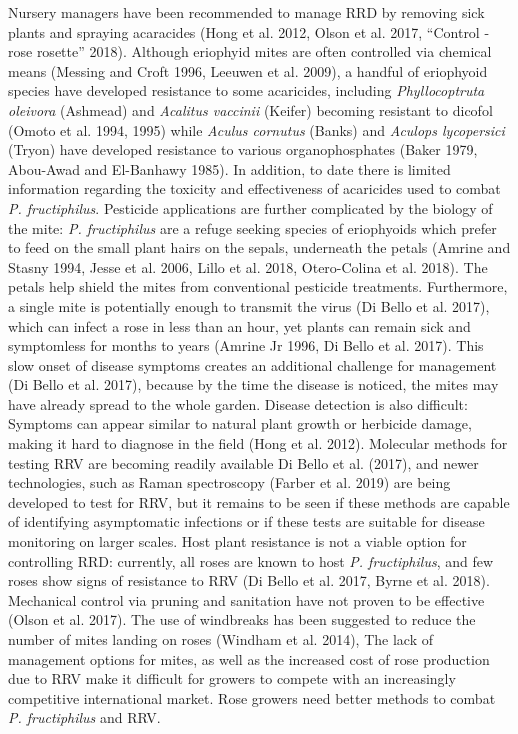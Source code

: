 \documentclass[12pt,final,CPage]{ufthesis}
\begin{document}
{  Nursery managers have been recommended to manage RRD by removing sick plants and spraying acaracides (Hong et al. 2012, Olson et al. 2017, {``Control - rose rosette''} 2018). Although eriophyid mites are often controlled via chemical means (Messing and Croft 1996, Leeuwen et al. 2009), a handful of eriophyoid species have developed resistance to some acaricides, including \emph{Phyllocoptruta oleivora} (Ashmead) and \emph{Acalitus vaccinii} (Keifer) becoming resistant to dicofol (Omoto et al. 1994, 1995) while \emph{Aculus cornutus} (Banks) and \emph{Aculops lycopersici} (Tryon) have developed resistance to various organophosphates (Baker 1979, Abou-Awad and El-Banhawy 1985). In addition, to date there is limited information regarding the toxicity and effectiveness of acaricides used to combat \emph{P. fructiphilus}. Pesticide applications are further complicated by the biology of the mite: \emph{P. fructiphilus} are a refuge seeking species of eriophyoids which prefer to feed on the small plant hairs on the sepals, underneath the petals (Amrine and Stasny 1994, Jesse et al. 2006, Lillo et al. 2018, Otero-Colina et al. 2018). The petals help shield the mites from conventional pesticide treatments. Furthermore, a single mite is potentially enough to transmit the virus (Di Bello et al. 2017), which can infect a rose in less than an hour, yet plants can remain sick and symptomless for months to years (Amrine Jr 1996, Di Bello et al. 2017). This slow onset of disease symptoms creates an additional challenge for management (Di Bello et al. 2017), because by the time the disease is noticed, the mites may have already spread to the whole garden. Disease detection is also difficult: Symptoms can appear similar to natural plant growth or herbicide damage, making it hard to diagnose in the field (Hong et al. 2012). Molecular methods for testing RRV are becoming readily available Di Bello et al. (2017), and newer technologies, such as Raman spectroscopy (Farber et al. 2019) are being developed to test for RRV, but it remains to be seen if these methods are capable of identifying asymptomatic infections or if these tests are suitable for disease monitoring on larger scales. Host plant resistance is not a viable option for controlling RRD: currently, all roses are known to host \emph{P. fructiphilus}, and few roses show signs of resistance to RRV (Di Bello et al. 2017, Byrne et al. 2018). Mechanical control via pruning and sanitation have not proven to be effective (Olson et al. 2017). The use of windbreaks has been suggested to reduce the number of mites landing on roses (Windham et al. 2014), The lack of management options for mites, as well as the increased cost of rose production due to RRV make it difficult for growers to compete with an increasingly competitive international market. Rose growers need better methods to combat \emph{P. fructiphilus} and RRV.
}
\end{document}
